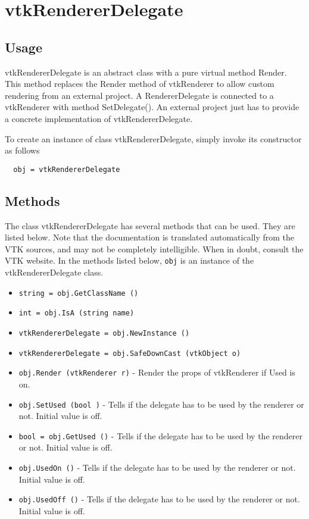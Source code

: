 \section{vtkRendererDelegate}

\subsection{Usage}

 vtkRendererDelegate is an abstract class with a pure virtual method Render.
 This method replaces the Render method of vtkRenderer to allow custom
 rendering from an external project. A RendererDelegate is connected to
 a vtkRenderer with method SetDelegate(). An external project just
 has to provide a concrete implementation of vtkRendererDelegate.

To create an instance of class vtkRendererDelegate, simply
invoke its constructor as follows
\begin{verbatim}
  obj = vtkRendererDelegate
\end{verbatim}
\subsection{Methods}

The class vtkRendererDelegate has several methods that can be used.
  They are listed below.
Note that the documentation is translated automatically from the VTK sources,
and may not be completely intelligible.  When in doubt, consult the VTK website.
In the methods listed below, \verb|obj| is an instance of the vtkRendererDelegate class.
\begin{itemize}
\item  \verb|string = obj.GetClassName ()|

\item  \verb|int = obj.IsA (string name)|

\item  \verb|vtkRendererDelegate = obj.NewInstance ()|

\item  \verb|vtkRendererDelegate = obj.SafeDownCast (vtkObject o)|

\item  \verb|obj.Render (vtkRenderer r)| -  Render the props of vtkRenderer if Used is on.

\item  \verb|obj.SetUsed (bool )| -  Tells if the delegate has to be used by the renderer or not.
 Initial value is off.

\item  \verb|bool = obj.GetUsed ()| -  Tells if the delegate has to be used by the renderer or not.
 Initial value is off.

\item  \verb|obj.UsedOn ()| -  Tells if the delegate has to be used by the renderer or not.
 Initial value is off.

\item  \verb|obj.UsedOff ()| -  Tells if the delegate has to be used by the renderer or not.
 Initial value is off.

\end{itemize}
